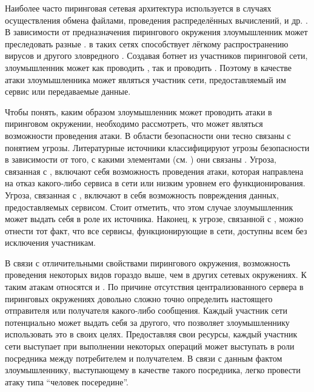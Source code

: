 %
Наиболее часто пиринговая сетевая архитектура используется в случаях осуществления обмена файлами, проведения распределённых вычислений,  и др. .
%
%
В зависимости от предназначения пирингового окружения злоумышленник может преследовать разные   . 
%
 в таких сетях способствует лёгкому распространению вирусов и другого зловредного . 
%
Создавая ботнет из участников пиринговой сети, злоумышленник может как проводить , так и проводить . 
%
Поэтому в качестве  атаки злоумышленника может являться участник сети, предоставляемый им сервис или передаваемые данные. 

%
Чтобы понять, каким образом злоумышленник может проводить атаки в пиринговом окружении, необходимо рассмотреть, что может являться  возможности проведения атаки.
%
В области безопасности они тесно связаны с понятием угрозы.
%
Литературные источники классифицируют угрозы безопасности в зависимости от того, с какими элементами  (см. ) они связаны   . 
%
Угроза, связанная с , включают себя возможность проведения атаки, которая направлена на отказ какого-либо сервиса в сети или низким уровнем его функционирования. 
%
Угроза, связанная с , включают в себя возможность повреждения данных, предоставляемых сервисом. 
%
Стоит отметить, что этом случае злоумышленник может выдать себя в роле их источника. 
%
Наконец, к угрозе, связанной с , можно отнести тот факт, что все сервисы, функционирующие в сети, доступны всем без исключения участникам.

%
В связи с отличительными свойствами пирингового окружения, возможность проведения некоторых видов  гораздо выше, чем в других сетевых окружениях. 
%
К таким атакам относятся  и  . 
%
По причине отсутствия централизованного сервера в пиринговых окружениях довольно сложно точно определить настоящего отправителя или получателя какого-либо сообщения.
%
Каждый участник сети потенциально может выдать себя за другого, что позволяет злоумышленнику использовать это в своих целях.  
%
Предоставляя свои ресурсы, каждый участник сети выступает при выполнении некоторых операций может выступать в роли посредника между потребителем и получателем.
%
В связи с данным фактом злоумышленнику, выступающему в качестве такого посредника, легко провести атаку типа ``человек посередине''. 

